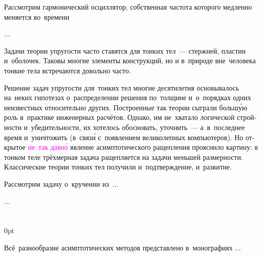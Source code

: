 

\begin{otherlanguage}{russian}

Рассмотрим гармонический осциллятор, собственная частота которого медленно меняется во~времени

...



\end{otherlanguage}



\begin{otherlanguage}{russian}

Задачи теории упругости часто ставятся для тонких тел~--- стержней, пластин и~оболочек. Таковы многие элементы конструкций, но и в~природе вне~человека тонкие тела встречаются довольно часто.

Решение задач упругости для~тонких тел многие десятилетия основывалось на~неких гипотезах о~распределении решения по~толщине и~о~порядках одних неизвестных относительно других. Построенные так теории сыграли больш\'{у}ю роль в~практике инженерных расчётов. Однако, им не~хватало логической стройности и~убедительности, их хотелось обосновать, уточнить~--- а~в~последнее время и~уничтожить (в~связ\'{и} с~появлением великолепных компьютеров). Но открытое \textcolor{magenta}{не~так давн\'{о}} явление асимптотического ращепления прояснило картину: в тонком теле трёхмерная задача ращепляется на задачи меньшей размерности. Классические теории тонких тел получили и~подтверждение, и~развитие.

Рассмотрим задачу о~кручении из~...

...




\end{otherlanguage}

\section*{\small \wordforbibliography}

\begin{changemargin}{\parindent}{0pt}
\fontsize{10}{12}\selectfont

\begin{otherlanguage}{russian}

Всё~разнообразие асимптотических методов представлено в~монографиях ...

\end{otherlanguage}

\end{changemargin}
